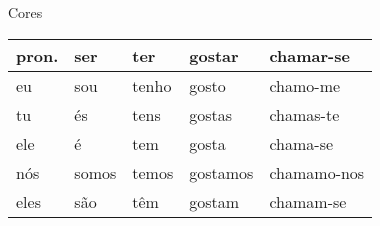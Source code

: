\documentclass[xcolor={table}]{beamer}
\begin{document}
\begin{frame}{Cores}
    \begin{tabular}{lllll}
        \rowcolor{black!5}
        \textbf{pron.} & \textbf{ser} & \textbf{ter} & \textbf{gostar} & \textbf{chamar-se}\\
        \midrule
        eu & sou & tenho & gosto & chamo-me \\
        tu & és & tens & gostas & chamas-te \\
        ele & é & tem & gosta & chama-se \\
        nós & somos & temos & gostamos & chamamo-nos \\
        eles & são & têm & gostam & chamam-se \\
        \bottomrule
    \end{tabular}
\end{frame}
\end{document}
